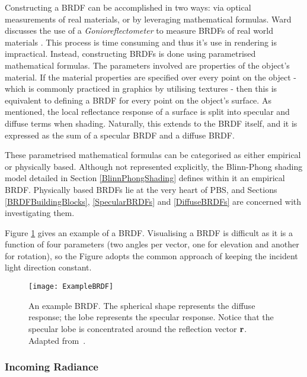 Constructing a BRDF can be accomplished in two ways: via optical measurements of real materials, or by leveraging mathematical formulas. Ward discusses the use of a \textit{Gonioreflectometer} to measure BRDFs of real world materials \cite{MeasuringAnisotropicReflections}. This process is time consuming and thus it's use in rendering is impractical. Instead, constructing BRDFs is done using parametrised mathematical formulas. The parameters involved are properties of the object's material. If the material properties are specified over every point on the object - which is commonly practiced in graphics by utilising textures - then this is equivalent to defining a BRDF for every point on the object's surface. As mentioned, the local reflectance response of a surface is split into specular and diffuse terms when shading. Naturally, this extends to the BRDF itself, and it is expressed as the sum of a specular BRDF and a diffuse BRDF.

These parametrised mathematical formulas can be categorised as either empirical or physically based. Although not represented explicitly, the Blinn-Phong shading model detailed in Section \ref{BlinnPhongShading} defines within it an empirical BRDF. Physically based BRDFs lie at the very heart of PBS, and Sections \ref{BRDFBuildingBlocks}, \ref{SpecularBRDFs} and \ref{DiffuseBRDFs} are concerned with investigating them.

Figure \ref{fig:ExampleBRDF} gives an example of a BRDF. Visualising a BRDF is difficult as it is a function of four parameters (two angles per vector, one for elevation and another for rotation), so the Figure adopts the common approach of keeping the incident light direction constant.

\begin{figure}[h]
	\centering
	\texttt{[image: ExampleBRDF]}
	\caption{An example BRDF. The spherical shape represents the diffuse response; the lobe represents the specular response. Notice that the specular lobe is concentrated around the reflection vector \begin{math}\mathbf{r}\end{math}. Adapted from~\cite{FaulInfluenceOfFresnelEffect}.}
	\label{fig:ExampleBRDF}
\end{figure}

\vspace{-0.3cm}

\subsubsection{Incoming Radiance}

